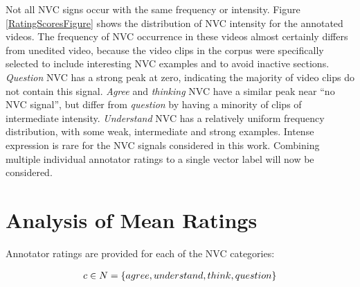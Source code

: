 Not all \ac{NVC} signs occur with the same frequency or intensity. Figure \ref{RatingScoresFigure} shows the distribution of \ac{NVC} intensity for the annotated videos. The frequency of \ac{NVC} occurrence in these videos almost certainly differs from unedited video, because the video clips in the corpus were specifically selected to include interesting \ac{NVC} examples and to avoid inactive sections. \textit{Question} \ac{NVC} has a strong peak at zero, indicating the majority of video clips do not contain this signal. 
\textit{Agree} and \textit{thinking} \ac{NVC} have a similar peak near ``no \ac{NVC} signal'', but differ from \textit{question} by having a minority of clips of intermediate intensity. \textit{Understand} \ac{NVC} has a relatively uniform frequency distribution, with some weak, intermediate and strong examples. Intense expression is rare for the \ac{NVC} signals considered in this work. Combining multiple individual annotator ratings to a single vector label will now be considered.

\section{Analysis of Mean Ratings}
\label{SectionAnalysisOfMeanRatings}

Annotator ratings are provided for each of the \ac{NVC} categories:

\begin{align}
c \in N = \{agree, understand, think, question\}
\end{align}

